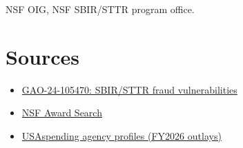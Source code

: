 \documentclass[letterpaper,11pt]{article}
\providecommand{\tightlist}{\setlength{\itemsep}{0pt}\setlength{\parskip}{0pt}}
\begin{document}
NSF OIG, NSF SBIR/STTR program office.

\hypertarget{sources}{%
\section{Sources}\label{sources}}

\begin{itemize}
\tightlist
\item
  \href{https://www.gao.gov/products/GAO-24-105470}{GAO-24-105470:
  SBIR/STTR fraud vulnerabilities}
\item
  \href{https://www.nsf.gov/awardsearch/}{NSF Award Search}
\item
  \href{https://www.usaspending.gov/agency}{USAspending agency profiles
  (FY2026 outlays)}
\end{itemize}
\end{document}
